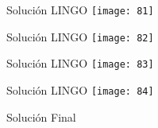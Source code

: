 \documentclass{beamer}
\begin{document}
\begin{frame}[fragile]{Solución LINGO}
    \texttt{[image: 81]}
\end{frame}
\begin{frame}[fragile]{Solución LINGO}
    \texttt{[image: 82]}
\end{frame}
\begin{frame}[fragile]{Solución LINGO}
    \texttt{[image: 83]}
\end{frame}
\begin{frame}[fragile]{Solución LINGO}
    \texttt{[image: 84]}
\end{frame}

\begin{frame}[fragile]{Solución Final}
\end{frame}
\end{document}

